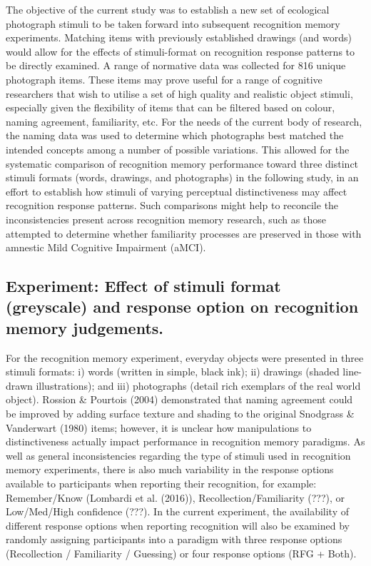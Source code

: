 \documentclass[
  11pt,
]{article}
\begin{document}
The objective of the current study was to establish a new set of
ecological photograph stimuli to be taken forward into subsequent
recognition memory experiments. Matching items with previously
established drawings (and words) would allow for the effects of
stimuli-format on recognition response patterns to be directly examined.
A range of normative data was collected for 816 unique photograph items.
These items may prove useful for a range of cognitive researchers that
wish to utilise a set of high quality and realistic object stimuli,
especially given the flexibility of items that can be filtered based on
colour, naming agreement, familiarity, etc. For the needs of the current
body of research, the naming data was used to determine which
photographs best matched the intended concepts among a number of
possible variations. This allowed for the systematic comparison of
recognition memory performance toward three distinct stimuli formats
(words, drawings, and photographs) in the following study, in an effort
to establish how stimuli of varying perceptual distinctiveness may
affect recognition response patterns. Such comparisons might help to
reconcile the inconsistencies present across recognition memory
research, such as those attempted to determine whether familiarity
processes are preserved in those with amnestic Mild Cognitive Impairment
(aMCI).

\hypertarget{experiment-effect-of-stimuli-format-greyscale-and-response-option-on-recognition-memory-judgements.}{%
\subsection{Experiment: Effect of stimuli format (greyscale) and
response option on recognition memory
judgements.}\label{experiment-effect-of-stimuli-format-greyscale-and-response-option-on-recognition-memory-judgements.}}

For the recognition memory experiment, everyday objects were presented
in three stimuli formats: i) words (written in simple, black ink); ii)
drawings (shaded line-drawn illustrations); and iii) photographs (detail
rich exemplars of the real world object). Rossion \& Pourtois (2004)
demonstrated that naming agreement could be improved by adding surface
texture and shading to the original Snodgrass \& Vanderwart (1980)
items; however, it is unclear how manipulations to distinctiveness
actually impact performance in recognition memory paradigms. As well as
general inconsistencies regarding the type of stimuli used in
recognition memory experiments, there is also much variability in the
response options available to participants when reporting their
recognition, for example: Remember/Know (Lombardi et al. (2016)),
Recollection/Familiarity (???), or Low/Med/High confidence (???). In the
current experiment, the availability of different response options when
reporting recognition will also be examined by randomly assigning
participants into a paradigm with three response options (Recollection /
Familiarity / Guessing) or four response options (RFG + Both).
\end{document}
